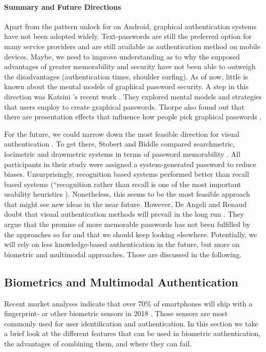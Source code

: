 	\paragraph{Summary and Future Directions}
	Apart from the pattern unlock for on Android, graphical authentication systems have not been adopted widely. Text-passwords are still the preferred option for many service providers and are still available as authentication method on mobile devices. Maybe, we need to improve understanding as to why the supposed advantages of greater memorability and security have not been able to outweigh the disadvantages (authentication times, shoulder surfing). As of now, little is known about the mental models of graphical password security. A step in this direction was Katsini \etal's recent work \cite{Katsini2017StrategiesGraphicalPasswords}. They explored mental models and strategies that users employ to create graphical passwords. Thorpe \etal also found out that there are presentation effects that influence how people pick graphical passwords \cite{Thorpe2014PresentationEffects}. 
	
	For the future, we could narrow down the most feasible direction for visual authentication \cite{Biddle2009GraphicalFirstTwelveYears}. To get there, Stobert and Biddle compared searchmetric, locimetric and drawmetric systems in terms of password memorability \cite{Stobert2013GraphicalPasswords}. All participants in their study were assigned a system-generated password to reduce biases. Unsurprisingly, recognition based systems performed better than recall based systems (``recognition rather than recall is one of the most important usability heuristics \cite{Nielsen1994EnhancingHeuristics}). Nonetheless, this seems to be the most feasible approach that might see new ideas in the near future.
	However, De Angeli and Renaud \etal doubt that visual authentication methods will prevail in the long run \cite{DeAngeli2005PictureThousandWords, Renaud2009VisualSnakeOil}. They argue that the promise of more memorable passwords has not been fulfilled by the approaches so far and that we should keep looking elsewhere. Potentially, we will rely on less knowledge-based authentication in the future, but more on biometric and multimodal approaches. Those are discussed in the following. 

	\subsection{Biometrics and Multimodal Authentication}
	Recent market analyses indicate that over 70\% of smartphones will ship with a fingerprint- or other biometric sensors in 2018 . Those sensors are most commonly used for user identification and authentication. In this section we take a brief look at the different features that can be used in biometric authentication, the advantages of combining them, and where they can fail. 
	
